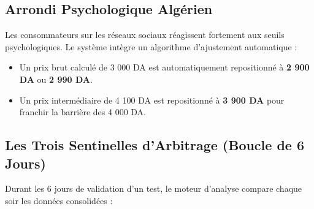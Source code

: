 \documentclass[11pt,a4paper]{article}
\begin{document}
\subsection{Arrondi Psychologique Algérien}
Les consommateurs sur les réseaux sociaux réagissent fortement aux seuils psychologiques. Le système intègre un algorithme d'ajustement automatique :
\begin{itemize}[leftmargin=*]
    \item Un prix brut calculé de 3 000 DA est automatiquement repositionné à \textbf{2 900 DA} ou \textbf{2 990 DA}.
    \item Un prix intermédiaire de 4 100 DA est repositionné à \textbf{3 900 DA} pour franchir la barrière des 4 000 DA.
\end{itemize}

\subsection{Les Trois Sentinelles d'Arbitrage (Boucle de 6 Jours)}
Durant les 6 jours de validation d'un test, le moteur d'analyse compare chaque soir les données consolidées :
\end{document}
